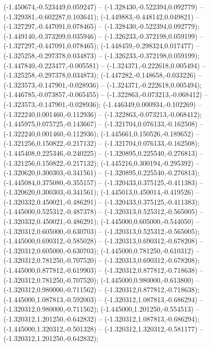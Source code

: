  (-1.450674,-0.523449,0.059247) -- (-1.328430,-0.522394,0.092779) -- (-1.329381,-0.602287,0.103641);
 (-1.449883,-0.448142,0.049821) -- (-1.327297,-0.447091,0.078465) -- (-1.328430,-0.522394,0.092779);
 (-1.449140,-0.373209,0.035946) -- (-1.326233,-0.372198,0.059199) -- (-1.327297,-0.447091,0.078465);
 (-1.448459,-0.298324,0.017477) -- (-1.325258,-0.297378,0.034873) -- (-1.326233,-0.372198,0.059199);
 (-1.447840,-0.223477,-0.005581) -- (-1.324371,-0.222618,0.005494) -- (-1.325258,-0.297378,0.034873);
 (-1.447282,-0.148658,-0.033226) -- (-1.323573,-0.147901,-0.028936) -- (-1.324371,-0.222618,0.005494);
 (-1.446785,-0.073857,-0.065455) -- (-1.322863,-0.073213,-0.068412) -- (-1.323573,-0.147901,-0.028936);
 (-1.446349,0.000934,-0.102269) -- (-1.322240,0.001460,-0.112936) -- (-1.322863,-0.073213,-0.068412);
 (-1.445975,0.075725,-0.143667) -- (-1.321704,0.076133,-0.162508) -- (-1.322240,0.001460,-0.112936);
 (-1.445661,0.150526,-0.189652) -- (-1.321256,0.150822,-0.217132) -- (-1.321704,0.076133,-0.162508);
 (-1.445408,0.225346,-0.240225) -- (-1.320895,0.225540,-0.276813) -- (-1.321256,0.150822,-0.217132);
 (-1.445216,0.300194,-0.295392) -- (-1.320620,0.300303,-0.341561) -- (-1.320895,0.225540,-0.276813);
 (-1.445084,0.375080,-0.355157) -- (-1.320433,0.375125,-0.411383) -- (-1.320620,0.300303,-0.341561);
 (-1.445013,0.450014,-0.419526) -- (-1.320332,0.450021,-0.486291) -- (-1.320433,0.375125,-0.411383);
 (-1.445000,0.525312,-0.487378) -- (-1.320313,0.525312,-0.565005) -- (-1.320332,0.450021,-0.486291);
 (-1.445000,0.605000,-0.544050) -- (-1.320312,0.605000,-0.630703) -- (-1.320313,0.525312,-0.565005);
 (-1.445000,0.690312,-0.585028) -- (-1.320313,0.690312,-0.678208) -- (-1.320312,0.605000,-0.630703);
 (-1.445000,0.781250,-0.610312) -- (-1.320312,0.781250,-0.707520) -- (-1.320313,0.690312,-0.678208);
 (-1.445000,0.877812,-0.619903) -- (-1.320312,0.877812,-0.718638) -- (-1.320312,0.781250,-0.707520);
 (-1.445000,0.980000,-0.613800) -- (-1.320312,0.980000,-0.711562) -- (-1.320312,0.877812,-0.718638);
 (-1.445000,1.087813,-0.592003) -- (-1.320312,1.087813,-0.686294) -- (-1.320312,0.980000,-0.711562);
 (-1.445000,1.201250,-0.554513) -- (-1.320312,1.201250,-0.642832) -- (-1.320312,1.087813,-0.686294);
 (-1.445000,1.320312,-0.501328) -- (-1.320312,1.320312,-0.581177) -- (-1.320312,1.201250,-0.642832);
